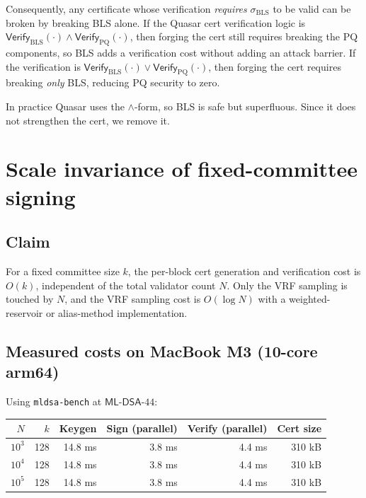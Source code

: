\documentclass[11pt]{article}
\begin{document}
Consequently, any certificate whose verification \emph{requires}
$\sigma_{\text{BLS}}$ to be valid can be broken by breaking BLS alone.
If the Quasar cert verification logic is
$\mathsf{Verify}_{\text{BLS}}(\cdot) \land \mathsf{Verify}_{\text{PQ}}(\cdot)$,
then forging the cert still requires breaking the PQ components, so
BLS adds a verification cost without adding an attack barrier.
If the verification is $\mathsf{Verify}_{\text{BLS}}(\cdot) \lor \mathsf{Verify}_{\text{PQ}}(\cdot)$,
then forging the cert requires breaking \emph{only} BLS, reducing PQ
security to zero.

In practice Quasar uses the $\land$-form, so BLS is safe but superfluous.
Since it does not strengthen the cert, we remove it.

\section{Scale invariance of fixed-committee signing}

\subsection{Claim}

For a fixed committee size $k$, the per-block cert generation and
verification cost is $O(k)$, independent of the total validator count $N$.
Only the VRF sampling is touched by $N$, and the VRF sampling cost
is $O(\log N)$ with a weighted-reservoir or alias-method implementation.

\subsection{Measured costs on MacBook M3 (10-core arm64)}

Using \texttt{mldsa-bench} at $\mathsf{ML\text{-}DSA}\text{-}44$:

\begin{center}
\begin{tabular}{rrrrrr}
\toprule
$N$ & $k$ & Keygen & Sign (parallel) & Verify (parallel) & Cert size \\
\midrule
$10^3$  & 128 & 14.8 ms & 3.8 ms & 4.4 ms & 310 kB \\
$10^4$  & 128 & 14.8 ms & 3.8 ms & 4.4 ms & 310 kB \\
$10^5$  & 128 & 14.8 ms & 3.8 ms & 4.4 ms & 310 kB \\
\bottomrule
\end{tabular}
\end{center}
\end{document}
